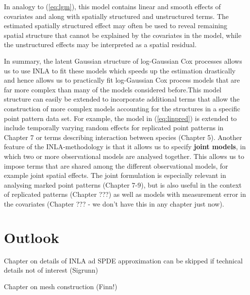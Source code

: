 In analogy to (\ref{eq:lgm}), this model contains linear and smooth effects of covariates and along with spatially structured and unstructured terms. The estimated spatially structured effect may often be used to reveal remaining spatial structure that cannot be explained by the covariates in the model, while the unstructured effects may be interpreted as a spatial residual.

In summary, the latent Gaussian structure of log-Gaussian Cox processes allows us to use INLA to fit these models which speeds up the estimation drastically and hence allows us to practically fit log-Gaussian Cox process models that are far more complex than many of the models considered before.This model structure can easily be extended to incorporate additional terms that allow the construction of more complex models accounting for the structures in a specific point pattern data set. For example, the model in (\ref{eq:linpred}) is extended to include temporally varying random effects for replicated point patterns in Chapter 7 or terms describing interaction between species (Chapter 5). Another feature of the INLA-methodology is that it allows us to specify \textbf{joint models}, in which two or more observational models are analysed together. This allows us to impose terms that are shared among the different observational models, for example joint spatial effects. The joint formulation is especially relevant in analysing marked point patterns (Chapter 7-9), but is also useful in the context of replicated patterns (Chapter ???) as well as models with measurement error in the covariates (Chapter ??? - we don't have this in any chapter just now).


\section{Outlook}

Chapter on details of INLA ad SPDE approximation can be skipped if technical details not of interest (Sigrunn)

Chapter on mesh construction (Finn!)
